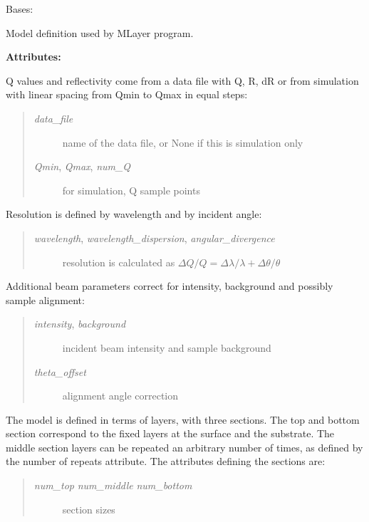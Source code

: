 \documentclass[letterpaper,10pt,english]{sphinxmanual}
\begin{document}
\begin{fulllineitems}
\label{api/staj:refl1d.staj.MlayerModel}
Bases: 

Model definition used by MLayer program.

\textbf{Attributes:}

Q values and reflectivity come from a data file with Q, R, dR or
from simulation with linear spacing from Qmin to Qmax in equal steps:
\begin{quote}
\begin{description}
\item[{\emph{data\_file}}] \leavevmode
name of the data file, or None if this is simulation only

\item[{\emph{Qmin}, \emph{Qmax}, \emph{num\_Q}}] \leavevmode
for simulation, Q sample points

\end{description}
\end{quote}

Resolution is defined by wavelength and by incident angle:
\begin{quote}
\begin{description}
\item[{\emph{wavelength}, \emph{wavelength\_dispersion}, \emph{angular\_divergence}}] \leavevmode
resolution is calculated as
$\Delta Q/Q = \Delta\lambda/\lambda + \Delta\theta/\theta$

\end{description}
\end{quote}

Additional beam parameters correct for intensity, background and
possibly sample alignment:
\begin{quote}
\begin{description}
\item[{\emph{intensity}, \emph{background}}] \leavevmode
incident beam intensity and sample background

\item[{\emph{theta\_offset}}] \leavevmode
alignment angle correction

\end{description}
\end{quote}

The model is defined in terms of layers, with three sections.  The top
and bottom section correspond to the fixed layers at the surface and
the substrate.  The middle section layers can be repeated an arbitrary
number of times, as defined by the number of repeats attribute.  The
attributes defining the sections are:
\begin{quote}
\begin{description}
\item[{\emph{num\_top} \emph{num\_middle} \emph{num\_bottom}}] \leavevmode
section sizes


\end{description}
\end{quote}
\end{fulllineitems}
\end{document}
